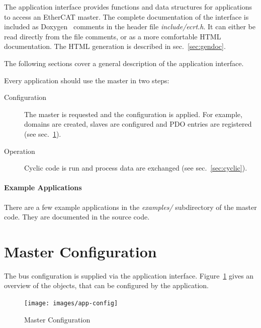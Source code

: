 \documentclass[a4paper,12pt,BCOR6mm,bibtotoc,idxtotoc]{scrbook}
\begin{document}
%

The application interface provides functions and data structures for
applications to access an EtherCAT master. The complete documentation of the
interface is included as Doxygen~\cite{doxygen} comments in the header file
\textit{include/ecrt.h}. It can either be read directly from the file
comments, or as a more comfortable HTML documentation. The HTML generation is
described in sec.~\ref{sec:gendoc}.

The following sections cover a general description of the application
interface.

Every application should use the master in two steps:

\begin{description}

\item[Configuration] The master is requested and the configuration is applied.
For example, domains are created, slaves are configured and PDO entries are
registered (see sec.~\ref{sec:masterconfig}).

\item[Operation] Cyclic code is run and process data are exchanged (see
sec.~\ref{sec:cyclic}).

\end{description}

\paragraph{Example Applications} There are a few
example applications in the \textit{examples/} subdirectory of the master
code. They are documented in the source code.


\section{Master Configuration}
\label{sec:masterconfig}

The bus configuration is supplied via the application interface.
Figure~\ref{fig:app-config} gives an overview of the objects, that can be
configured by the application.

\begin{figure}[htbp]
  \centering
  \texttt{[image: images/app-config]}
  \caption{Master Configuration}
  \label{fig:app-config}
\end{figure}
\end{document}
